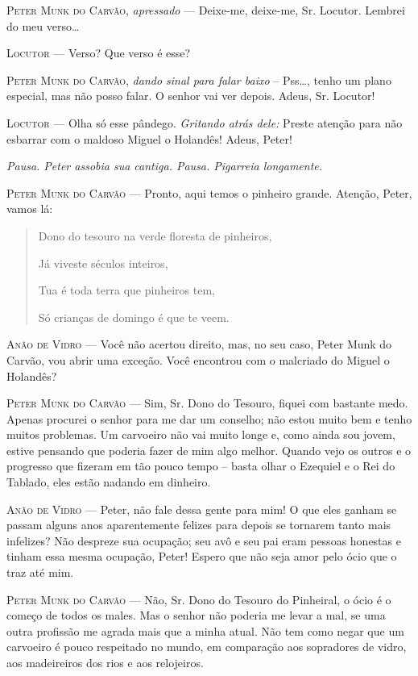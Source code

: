 \begin{myparindent}{0pt}
\begin{Parskip}
\textsc{Peter Munk do Carvão}, \emph{apressado} --- Deixe-me, deixe-me, Sr.
Locutor. Lembrei do meu verso\ldots{}

\textsc{Locutor} --- Verso? Que verso é esse?

\textsc{Peter Munk do Carvão}, \emph{dando sinal para falar baixo} --
Pss\ldots{}, tenho um plano especial, mas não posso falar. O senhor vai
ver depois. Adeus, Sr. Locutor!

\textsc{Locutor} --- Olha só esse pândego. \emph{Gritando atrás dele:} Preste
atenção para não esbarrar com o maldoso Miguel o Holandês! Adeus, Peter!

\emph{Pausa. Peter assobia sua cantiga. Pausa. Pigarreia longamente.}

\textsc{Peter Munk do Carvão} --- Pronto, aqui temos o pinheiro grande. Atenção,
Peter, vamos lá:

\begin{quote}
Dono do tesouro na verde floresta de pinheiros,

Já viveste séculos inteiros,

Tua é toda terra que pinheiros tem,

Só crianças de domingo é que te veem.
\end{quote}

\textsc{Anão de Vidro} --- Você não acertou direito, mas, no seu caso, Peter Munk
do Carvão, vou abrir uma exceção. Você encontrou com o malcriado do
Miguel o Holandês?

\textsc{Peter Munk do Carvão} --- Sim, Sr. Dono do Tesouro, fiquei com bastante
medo. Apenas procurei o senhor para me dar um conselho; não estou muito
bem e tenho muitos problemas. Um carvoeiro não vai muito longe e, como
ainda sou jovem, estive pensando que poderia fazer de mim algo melhor.
Quando vejo os outros e o progresso que fizeram em tão pouco tempo --
basta olhar o Ezequiel e o Rei do Tablado, eles estão nadando em
dinheiro.

\textsc{Anão de Vidro} --- Peter, não fale dessa gente para mim! O que eles ganham
se passam alguns anos aparentemente felizes para depois se tornarem
tanto mais infelizes? Não despreze sua ocupação; seu avô e seu pai eram
pessoas honestas e tinham essa mesma ocupação, Peter! Espero que não
seja amor pelo ócio que o traz até mim.

\textsc{Peter Munk do Carvão} --- Não, Sr. Dono do Tesouro do Pinheiral, o ócio é
o começo de todos os males. Mas o senhor não poderia me levar a mal, se
uma outra profissão me agrada mais que a minha atual. Não tem como negar
que um carvoeiro é pouco respeitado no mundo, em comparação aos
sopradores de vidro, aos madeireiros dos rios e aos relojeiros.


\end{Parskip}
\end{myparindent}
